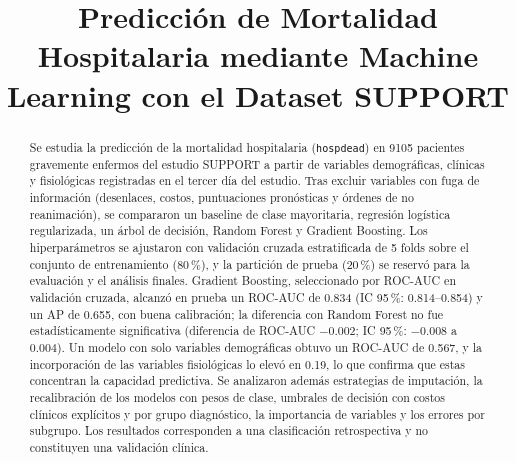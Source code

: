 \documentclass[conference]{IEEEtran}
\begin{document}
\title{Predicción de Mortalidad Hospitalaria mediante Machine Learning con el Dataset SUPPORT}

\author{
\and

\and

}

\maketitle

\begin{abstract}
Se estudia la predicción de la mortalidad hospitalaria (\texttt{hospdead}) en 9105 pacientes gravemente enfermos del estudio SUPPORT a partir de variables demográficas, clínicas y fisiológicas registradas en el tercer día del estudio. Tras excluir variables con fuga de información (desenlaces, costos, puntuaciones pronósticas y órdenes de no reanimación), se compararon un baseline de clase mayoritaria, regresión logística regularizada, un árbol de decisión, Random Forest y Gradient Boosting. Los hiperparámetros se ajustaron con validación cruzada estratificada de 5 folds sobre el conjunto de entrenamiento (80\,\%), y la partición de prueba (20\,\%) se reservó para la evaluación y el análisis finales. Gradient Boosting, seleccionado por ROC-AUC en validación cruzada, alcanzó en prueba un ROC-AUC de 0.834 (IC 95\,\%: 0.814--0.854) y un AP de 0.655, con buena calibración; la diferencia con Random Forest no fue estadísticamente significativa (diferencia de ROC-AUC $-0.002$; IC 95\,\%: $-0.008$ a $0.004$). Un modelo con solo variables demográficas obtuvo un ROC-AUC de 0.567, y la incorporación de las variables fisiológicas lo elevó en 0.19, lo que confirma que estas concentran la capacidad predictiva. Se analizaron además estrategias de imputación, la recalibración de los modelos con pesos de clase, umbrales de decisión con costos clínicos explícitos y por grupo diagnóstico, la importancia de variables y los errores por subgrupo. Los resultados corresponden a una clasificación retrospectiva y no constituyen una validación clínica.
\end{abstract}
\end{document}
